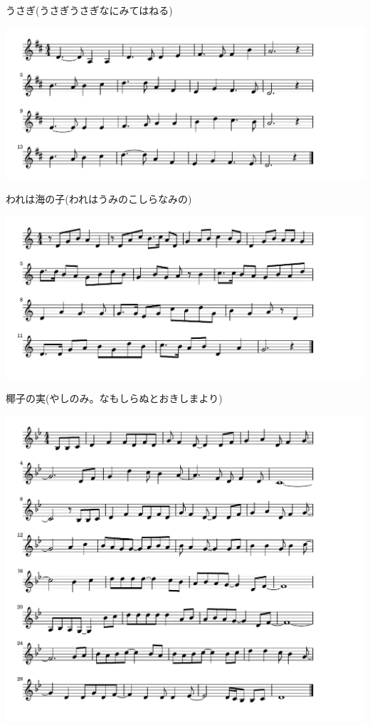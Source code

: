 \documentclass[a4paper]{ltjsarticle}
\begin{document}
\vspace{-10mm}

\parindent=50pt 
うさぎ(うさぎうさぎなにみてはねる)
\parindent=10pt

\vspace{10mm}


\includegraphics[clip]{warewaumi_crop.pdf}

\vspace{-10mm}

\parindent=50pt 
われは海の子(われはうみのこしらなみの)
\parindent=10pt

\vspace{10mm}


\includegraphics[clip]{yashinomi_crop.pdf}

\vspace{-10mm}

\parindent=50pt 
椰子の実(やしのみ。なもしらぬとおきしまより)
\parindent=10pt

\vspace{10mm}


\includegraphics[clip]{yesterdayonce_crop.pdf}
\end{document}
